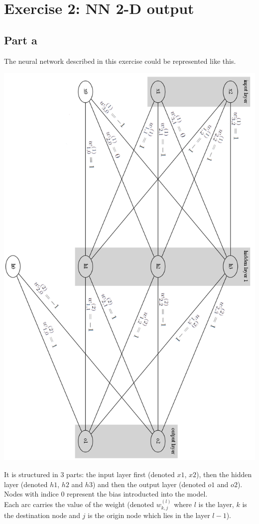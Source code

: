 \documentclass[a4paper, 10pt]{article}
\begin{document}
\section{Exercise 2: NN 2-D output}
\subsection{Part a}
The neural network described in this exercise could be represented like this.
\begin{center}
\includegraphics[scale=0.5]{ex2_graph_export}
\end{center}
It is structured in 3 parts: the input layer first (denoted $x1$, $x2$), then the hidden layer
(denoted $h1$, $h2$ and $h3$) and then the output layer (denoted $o1$ and $o2$).
\\
Nodes with indice 0 represent the bias introducted into the model.
\\ 
Each arc carries the value of the weight (denoted $w_{k,j}^{(l)}$ where $l$ is the layer, $k$ is the destination node
and $j$ is the origin node which lies in the layer $l-1$).
\end{document}
